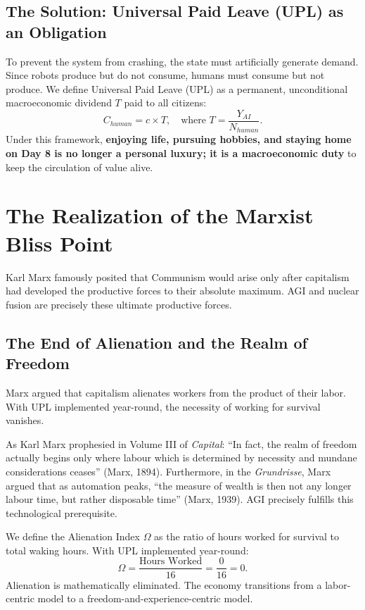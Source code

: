 \documentclass[AER]{AEA}
\begin{document}
\subsection{The Solution: Universal Paid Leave (UPL) as an Obligation}
To prevent the system from crashing, the state must artificially generate demand. Since robots produce but do not consume, humans must consume but not produce. 
We define Universal Paid Leave (UPL) as a permanent, unconditional macroeconomic dividend $T$ paid to all citizens:
\begin{equation}
C_{human} = c \times T, \quad \text{where } T = \frac{Y_{AI}}{N_{human}}.
\end{equation}
Under this framework, \textbf{enjoying life, pursuing hobbies, and staying home on Day 8 is no longer a personal luxury; it is a macroeconomic duty} to keep the circulation of value alive.

\section{The Realization of the Marxist Bliss Point}

Karl Marx famously posited that Communism would arise only after capitalism had developed the productive forces to their absolute maximum. AGI and nuclear fusion are precisely these ultimate productive forces.

\subsection{The End of Alienation and the Realm of Freedom}
Marx argued that capitalism alienates workers from the product of their labor. With UPL implemented year-round, the necessity of working for survival vanishes. 

As Karl Marx prophesied in Volume III of \textit{Capital}: ``In fact, the realm of freedom actually begins only where labour which is determined by necessity and mundane considerations ceases'' (Marx, 1894). Furthermore, in the \textit{Grundrisse}, Marx argued that as automation peaks, ``the measure of wealth is then not any longer labour time, but rather disposable time'' (Marx, 1939). AGI precisely fulfills this technological prerequisite. 

We define the Alienation Index $\Omega$ as the ratio of hours worked for survival to total waking hours. With UPL implemented year-round:
\begin{equation}
\Omega = \frac{\text{Hours Worked}}{16} = \frac{0}{16} = 0.
\end{equation}
Alienation is mathematically eliminated. The economy transitions from a labor-centric model to a freedom-and-experience-centric model.
\end{document}
